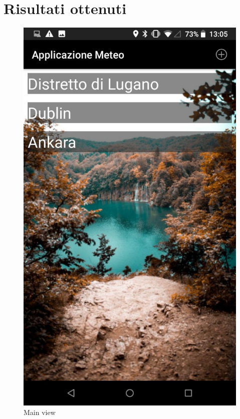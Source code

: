 \documentclass{article}
\begin{document}
\section{Risultati ottenuti}
\begin{figure}[!htb]
      \includegraphics[width=\linewidth]{images/sc2.jpg}
      \caption{Main view}\label{fig:awesome_image1}
    \endminipage\hfill

\end{figure}
\end{document}
